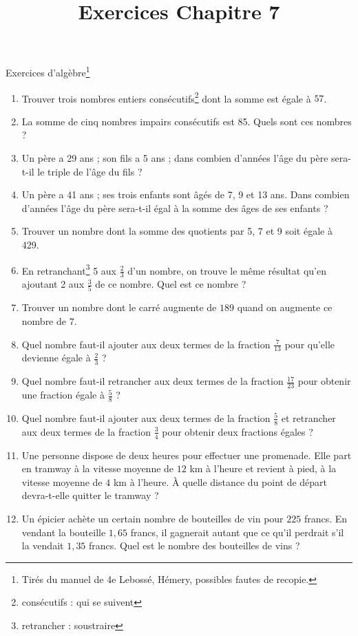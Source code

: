 \documentclass[12 pt]{extarticle}
\title{Exercices Chapitre 7}
\date{}
\theoremstyle{plain}
\begin{document}
\begin{center}{\Large Exercices d'algèbre\footnote{Tirés du manuel de 4e Lebossé, Hémery, possibles fautes de recopie.}}\\
 \end{center} 
 
 \begin{enumerate}
 \item Trouver trois nombres entiers consécutifs\footnote{consécutifs : qui se suivent} dont la somme est égale à $57$. 
 \item La somme de cinq nombres impairs consécutifs est 85. Quels sont ces nombres ? 
 \item Un père a 29 ans ; son fils a 5 ans ; dans combien d'années l'âge du père sera-t-il le triple de l'âge du fils ? 
 \item Un père a 41 ans ; ses trois enfants sont âgés de 7, 9 et 13 ans. Dans combien d'années l'âge du père sera-t-il égal à la somme des âges de ses enfants ? 
 \item Trouver un nombre dont la somme des quotients par 5, 7 et 9 soit égale à 429. 
 \item En retranchant\footnote{retrancher : soustraire} 5 aux $\frac23$ d'un nombre, on trouve le même résultat qu'en ajoutant 2 aux $\frac35$ de ce nombre. Quel est ce nombre ? 
 \item Trouver un nombre dont le carré augmente de $189$ quand on augmente ce nombre de $7$. 
 \item Quel nombre faut-il ajouter aux deux termes de la fraction $\frac7{13}$ pour qu'elle devienne égale à $\frac23$ ? 
 \item Quel nombre faut-il retrancher aux deux termes de la fraction $\frac{17}{23}$ pour obtenir une fraction égale à $\frac58$ ? 
 \item Quel nombre faut-il ajouter aux deux termes de la fraction $\frac58$ et retrancher aux deux termes de la fraction $\frac34$ pour obtenir deux fractions égales ? 
 \item Une personne dispose de deux heures pour effectuer une promenade. Elle part en tramway à la vitesse moyenne de $12$ km à l'heure et revient à pied, à la vitesse moyenne de $4$ km à l'heure. À quelle distance du point de départ devra-t-elle quitter le tramway ? 
 \item Un épicier achète un certain nombre de bouteilles de vin pour $225$ francs. En vendant la bouteille $1,65$ francs, il gagnerait autant que ce qu'il perdrait s'il la vendait $1,35$ francs. Quel est le nombre des bouteilles de vins ? 

\end{enumerate}
\end{document}
